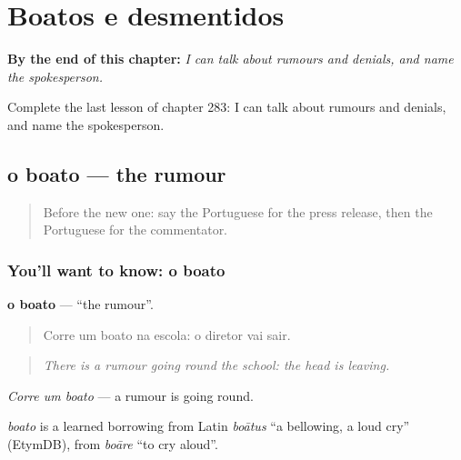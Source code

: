 
\chapter{Boatos e desmentidos}
\label{ch:pt-boatos-e-desmentidos}

\begin{chapteropening}
\textbf{By the end of this chapter:} \emph{I can talk about rumours and denials, and name the spokesperson.}

Complete the last lesson of chapter 283: I can talk about rumours and denials, and name the spokesperson.
\end{chapteropening}

\section[o boato]{o boato — the rumour}

\label{lesson:PT-C283-boato}



\begin{quote}
Before the new one: say the Portuguese for the press release, then the Portuguese for the commentator.
\end{quote}

\subsection*{You'll want to know: o boato}
\textbf{o boato} — \textquotedblleft{}the rumour\textquotedblright{}.

\begin{quote}
Corre um boato na escola: o diretor vai sair.
\end{quote}

\begin{quote}
\emph{There is a rumour going round the school: the head is leaving.}
\end{quote}

\emph{Corre um boato} — a rumour is going round.

\begin{cousinweb}
\emph{boato} is a learned borrowing from Latin \emph{boātus} \textquotedblleft{}a bellowing, a loud cry\textquotedblright{} (EtymDB), from \emph{boāre} \textquotedblleft{}to cry aloud\textquotedblright{}.
\end{cousinweb}

